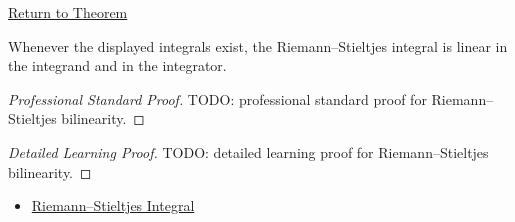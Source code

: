 \newpage
{}
\label{prf:rs-bilinearity}

\begin{remark*}[Return]
\hyperref[thm:rs-bilinearity]{Return to Theorem}
\end{remark*}

\begin{theorem*}
Whenever the displayed integrals exist, the Riemann--Stieltjes integral is
linear in the integrand and in the integrator.
\end{theorem*}

\begin{proof}[Professional Standard Proof]
\LRAProofBodyStart
TODO: professional standard proof for Riemann--Stieltjes bilinearity.
\end{proof}

\begin{proof}[Detailed Learning Proof]
\LRAProofBodyStart
TODO: detailed learning proof for Riemann--Stieltjes bilinearity.
\end{proof}

\begin{remark*}
\end{remark*}

\begin{dependencies}
\begin{itemize}
  \item \hyperref[def:riemann-stieltjes-integral]{Riemann--Stieltjes Integral}
\end{itemize}
\end{dependencies}

\clearpage
